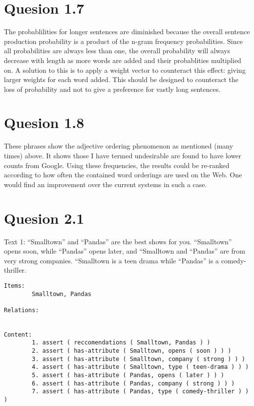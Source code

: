 \documentclass[a4paper,11pt,oneside]{article}
\begin{document}
\section{Quesion 1.7}
The probablilities for longer sentences are diminished because the overall sentence production probability is a product of the n-gram frequency probabilities. Since all probabilities are always less than one, the overall probability will always decrease with length as more words are added and their probablities multiplied on. A solution to this is to apply a weight vector to counteract this effect: giving larger weights for each word added. This should be designed to counteract the loss of probability and not to give a preference for vastly long sentences.

\section{Quesion 1.8}
These phrases show the adjective ordering phenomenon as mentioned (many times) above. It shows those I have termed undesirable are found to have lower counts from Google. Using these frequencies, the results could be re-ranked according to how often the contained word orderings are used on the Web. One would find an improvement over the current systems in such a case.

\section{Quesion 2.1}

Text 1:
“Smalltown” and “Pandas” are the best shows for you. “Smalltown” opens soon, while “Pandas” opens later, and “Smalltown and “Pandas” are from very strong companies. “Smalltown is a teen drama while “Pandas” is a comedy-thriller.
\begin{verbatim}
Items:
        Smalltown, Pandas

Relations:
        
        
Content:
        1. assert ( reccomendations ( Smalltown, Pandas ) )
        2. assert ( has-attribute ( Smalltown, opens ( soon ) ) )
        3. assert ( has-attribute ( Smalltown, company ( strong ) ) )
        4. assert ( has-attribute ( Smalltown, type ( teen-drama ) ) )
        5. assert ( has-attribute ( Pandas, opens ( later ) ) )
        6. assert ( has-attribute ( Pandas, company ( strong ) ) )
        7. assert ( has-attribute ( Pandas, type ( comedy-thriller ) ) )
\end{verbatim}
\end{document}
